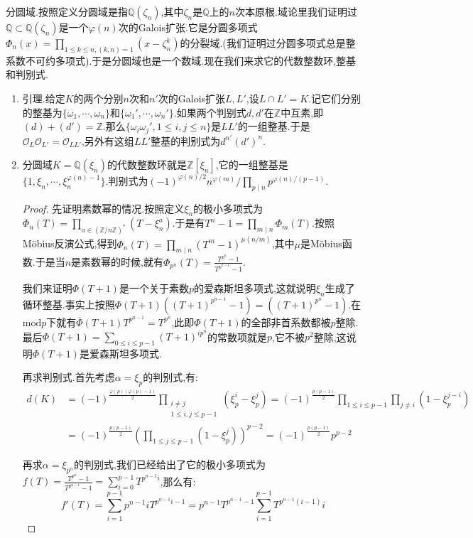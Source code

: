 分圆域.按照定义分圆域是指$\mathbb{Q}(\zeta_n)$,其中$\zeta_n$是$\mathbb{Q}$上的$n$次本原根.域论里我们证明过$\mathbb{Q}\subset\mathbb{Q}(\zeta_n)$是一个$\varphi(n)$次的Galois扩张.它是分圆多项式$\Phi_n(x)=\prod_{1\le k\le n,(k,n)=1}(x-\zeta_n^k)$的分裂域.(我们证明过分圆多项式总是整系数不可约多项式).于是分圆域也是一个数域.现在我们来求它的代数整数环,整基和判别式.
\begin{enumerate}
	\item 引理.给定$K$的两个分别$n$次和$n'$次的Galois扩张$L,L'$,设$L\cap L'=K$.记它们分别的整基为$\{\omega_1,\cdots,\omega_n\}$和$\{\omega_1',\cdots,\omega_n'\}$.如果两个判别式$d,d'$在$\mathbb{Z}$中互素,即$(d)+(d')=\mathbb{Z}$.那么$\{\omega_i\omega_j',1\le i,j\le n\}$是$LL'$的一组整基.于是$\mathscr{O}_L\mathscr{O}_{L'}=\mathscr{O}_{LL'}$,另外有这组$LL'$整基的判别式为$d^{n'}(d')^{n}$.
	\item 分圆域$K=\mathbb{Q}(\xi_{n})$的代数整数环就是$\mathbb{Z}[\xi_n]$,它的一组整基是$\{1,\xi_n,\cdots,\xi_n^{\varphi(n)-1}\}$.判别式为$(-1)^{\varphi(n)/2}n^{\varphi(m)}/\prod_{p\mid n}p^{\varphi(n)/(p-1)}$.
	\begin{proof}
		
		先证明素数幂的情况.按照定义$\xi_n$的极小多项式为$\Phi_n(T)=\prod_{a\in(\mathbb{Z}/n\mathbb{Z})^*}(T-\xi_n^a)$.于是有$T^n-1=\prod_{m\mid n}\Phi_m(T)$.按照M\"obius反演公式,得到$\Phi_n(T)=\prod_{m\mid n}(T^m-1)^{\mu(n/m)}$,其中$\mu$是M\"obius函数.于是当$n$是素数幂的时候,就有$\Phi_{p^n}(T)=\frac{T^{p^n}-1}{T^{p^{n-1}}-1}$.
		
		我们来证明$\Phi(T+1)$是一个关于素数$p$的爱森斯坦多项式,这就说明$\xi_n$生成了循环整基.事实上按照$\Phi(T+1)((T+1)^{p^{n-1}}-1)=((T+1)^{p^n}-1)$.在$\mathrm{mod}p$下就有$\overline{\Phi}(T+1)T^{p^{n-1}}=T^{p^n}$,此即$\Phi(T+1)$的全部非首系数都被$p$整除.最后$\Phi(T+1)=\sum_{0\le i\le p-1}(T+1)^{ip^n}$的常数项就是$p$,它不被$p^2$整除,这说明$\Phi(T+1)$是爱森斯坦多项式.
		
		再求判别式.首先考虑$\alpha=\xi_p$的判别式,有:
		\begin{align*}
		d(K)&=(-1)^{\frac{\varphi(p)(\varphi(p)-1)}{2}}\prod\limits_{\substack{i\not=j\\1\le i,j\le p-1}}\left(\xi_p^i-\xi_p^j\right)=(-1)^{\frac{p(p-1)}{2}}\prod_{1\le i\le p-1}\prod_{j\not=i}(1-\xi_p^{j-i})\\&=(-1)^{\frac{p(p-1)}{2}}\left(\prod_{1\le j\le p-1}(1-\xi_p^j)\right)^{p-2}=(-1)^{\frac{p(p-1)}{2}}p^{p-2}
		\end{align*}
		
		再求$\alpha=\xi_{p^n}$的判别式,我们已经给出了它的极小多项式为$f(T)=\frac{T^{p^n}-1}{T^{p^{n-1}}-1}=\sum_{i=0}^{p-1}T^{p^{n-1}i}$,那么有:
		$$f'(T)=\sum_{i=1}^{p-1}p^{n-1}iT^{p^{n-1}i-1}=p^{n-1}T^{p^{n-1}-1}\sum_{i=1}^{p-1}T^{p^{n-1}(i-1)}i$$
		

\end{proof}
\end{enumerate}
